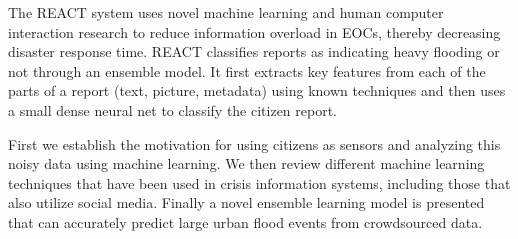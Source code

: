 The REACT system uses novel machine learning and human computer interaction
research to reduce information overload in EOCs, thereby decreasing disaster
response time. REACT classifies reports as indicating heavy flooding or not
through an ensemble model. It first extracts key features from each of the parts
of a report (text, picture, metadata) using known techniques and then uses a
small dense neural net to classify the citizen report.

First we establish the motivation for using citizens as sensors and
analyzing this noisy data using machine learning. We then review different
machine learning techniques that have been used in crisis information
systems, including those that also utilize social media.  Finally a novel
ensemble learning model is presented that can accurately predict large urban
flood events from crowdsourced data.
